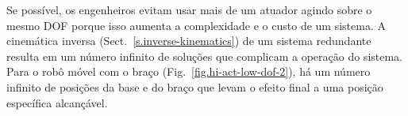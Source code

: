 
Se possível, os engenheiros evitam usar mais de um atuador agindo sobre o mesmo DOF porque isso aumenta a complexidade e o custo de um sistema. A cinemática inversa (Sect.~\ref{s.inverse-kinematics}) de um sistema redundante resulta em um número infinito de soluções que complicam a operação do sistema. Para o robô móvel com o braço (Fig.~\ref{fig.hi-act-low-dof-2}), há um número infinito de posições da base e do braço que levam o efeito final a uma posição específica alcançável.

